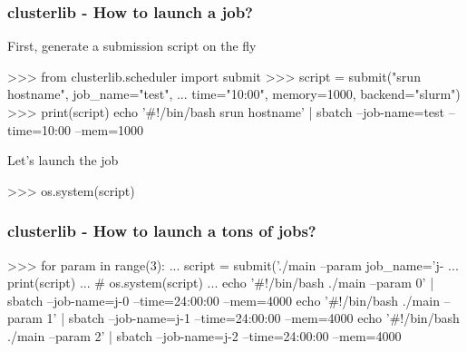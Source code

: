 \documentclass[11pt,compress,serif]{beamer}
\begin{document}

\begin{frame}[fragile=singleslide]
\frametitle{clusterlib - How to launch a job?}

First, generate a submission script on the fly
\begin{pythoncode}
>>> from clusterlib.scheduler import submit
>>> script = submit("srun hostname", job_name="test",
...                 time="10:00", memory=1000, backend="slurm")
>>> print(script)
echo '#!/bin/bash
srun hostname' | sbatch --job-name=test --time=10:00 --mem=1000 
\end{pythoncode}

Let's launch the job
\begin{pythoncode}
>>> os.system(script)
\end{pythoncode}
    
\end{frame}

\begin{frame}[fragile=singleslide]
\frametitle{clusterlib - How to launch a tons of jobs?}
    

\begin{pythoncode}
>>> for param in range(3):
...     script = submit('./main --param %
                        job_name='j-%
...     print(script)
...     # os.system(script)
... 
echo '#!/bin/bash
./main --param 0' | sbatch --job-name=j-0 --time=24:00:00 --mem=4000
echo '#!/bin/bash
./main --param 1' | sbatch --job-name=j-1 --time=24:00:00 --mem=4000
echo '#!/bin/bash
./main --param 2' | sbatch --job-name=j-2 --time=24:00:00 --mem=4000
\end{pythoncode}
        
\end{frame}
\end{document}
